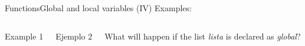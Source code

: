 \documentclass[10pt,compress]{beamer} %
\begin{document}
\begin{frame}{Functions}{Global and local variables (IV)}
Examples:
    \begin{columns}
		\begin{block}{Example 1}
		\vspace{-0.2cm}
		
	
		\end{block}
		\vspace{0.8cm}

		\begin{block}{Ejemplo 2}
		\vspace{-0.2cm}
		
		\vspace{-0.2cm}
		\end{block}
		What will happen if the list \textit{lista} is declared as \textit{global}?
	\end{columns}

\end{frame}
\end{document}
